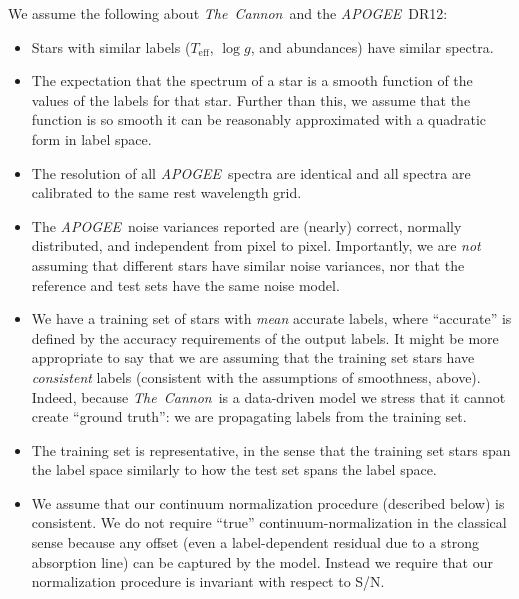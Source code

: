 \documentclass[12pt,preprint]{aastex6}
\newcommand{\project}[1]{\textsl{#1}}
\newcommand{\TheCannon}{\project{The~Cannon}}
\newcommand{\acronym}[1]{{\small{#1}}}
\newcommand{\apogee}{\project{\acronym{APOGEE}}}
\newcommand{\dr}{\acronym{DR12}}
\newcommand{\logg}{\log g}
\newcommand{\Teff}{T_{\mathrm{eff}}}
\begin{document}
\noindent{}We assume the following about \TheCannon\ and the \apogee\ \dr:
\begin{itemize}
\item
Stars with similar labels ($\Teff$, $\logg$, and abundances) have similar spectra.
\item
The expectation that the spectrum of a star is a smooth function of the values of 
the labels for that star.  Further than this, we assume that the function is so 
smooth it can be reasonably approximated with a quadratic form in label space.
\item
The resolution of all \apogee\ spectra are identical and all spectra are calibrated
to the same rest wavelength grid.
\item
The \apogee\ noise variances reported are (nearly) correct, normally distributed,
and independent from pixel to pixel.  
Importantly, we are \emph{not} assuming that different stars have similar noise
variances, nor that the reference and test sets have the same noise model.
\item
We have a training set of stars with \emph{mean} accurate labels, where ``accurate'' is 
defined by the accuracy requirements of the output labels.  It might be more 
appropriate to say that we are assuming that the training set stars have 
\emph{consistent} labels (consistent with the assumptions of smoothness, above).
Indeed, because \TheCannon\ is a data-driven model we stress that it cannot
create ``ground truth'': we are propagating labels from the training set.
\item
The training set is representative, in the sense that the training set stars 
span the label space similarly to how the test set spans the label
space.
\item
We assume that our continuum normalization procedure (described below) is consistent.
We do not require ``true'' continuum-normalization in the classical sense 
because any offset (even a label-dependent residual due to a strong absorption
line) can be captured by the model.  Instead we require that our normalization
procedure is invariant with respect to S/N.
\end{itemize}
\end{document}
